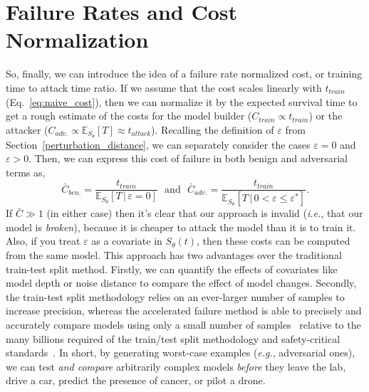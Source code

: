 \section{Failure Rates and Cost Normalization}


\label{cost_normalization}


So, finally, we can introduce the idea of a failure rate normalized cost, or training time to attack time ratio. If we assume that the cost scales linearly with $t_{train}$ (Eq.~\ref{eq:naive_cost}), then we can normalize it by the expected survival time to get a rough estimate of the costs for the model builder ($C_{train} \propto t_{train}$) or the attacker ($C_{adv.} \propto \mathbb{E}_{S_\theta}[T] \approx t_{attack}$). Recalling the definition of $\varepsilon$ from Section~\ref{perturbation_distance}, we can separately consider the cases $\varepsilon=0$ and $\varepsilon > 0$. Then, we can express this cost of failure in both benign and adversarial terms as,
\begin{equation}
	\bar{C}_{ben.} = \frac{t_{train}}{\mathbb{E}_{S_\theta}[T \,|\, \varepsilon = 0] }
	\text{~~and~~}
	\bar{C}_{adv.}=\frac{t_{train}}{\mathbb{E}_{S_\theta}[T \,|\, 0 < \varepsilon \leq \varepsilon^*]}.
	\label{eq:cost}
\end{equation}
If $\bar{C} \gg 1$ (in either case) then it's clear that our approach is invalid (\textit{i.e.}, that our model is \textit{broken}), because it is cheaper to attack the model than it is to train it. Also, if you treat $\varepsilon$ as a covariate in ${S_\theta}(t)$, then these costs can be computed from the same model.
This approach has two advantages over the traditional train-test split method. Firstly, we can quantify the effects of covariates like model depth or noise distance to compare the effect of model changes. Secondly, the train-test split methodology relies on an ever-larger number of samples to increase precision, whereas the accelerated failure method is able to precisely and accurately compare models using only a small number of samples~\cite{schmoor2000sample,lachin1981introduction} relative to the many billions required of the train/test split methodology and safety-critical standards~\cite{iso26262,IEC61508,IEC62034,meyers}.
In short, by generating worst-case examples (\textit{e.g.}, adversarial ones), we can test \textit{and compare} arbitrarily complex models \textit{before} they leave the lab, drive a car, predict the presence of cancer, or pilot a drone.
